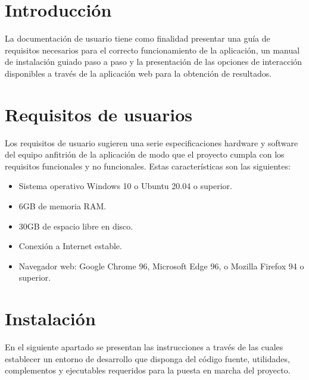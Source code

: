 
\section{Introducción}

La documentación de usuario tiene como finalidad presentar una guía de requisitos necesarios para el correcto funcionamiento de la aplicación, un manual de instalación guiado paso a paso y la presentación de las opciones de interacción disponibles a través de la aplicación web para la obtención de resultados.

\section{Requisitos de usuarios}

Los requisitos de usuario sugieren una serie especificaciones hardware y software del equipo anfitrión de la aplicación de modo que el proyecto cumpla con los requisitos funcionales y no funcionales. Estas características son las siguientes:

\begin{itemize} \setlength\itemsep{0.2em}
    \item Sistema operativo Windows 10 o Ubuntu 20.04 o superior.
    \item 6GB de memoria RAM.
    \item 30GB de espacio libre en disco.
    \item Conexión a Internet estable.
    \item Navegador web: Google Chrome 96, Microsoft Edge 96, o Mozilla Firefox 94 o superior.
\end{itemize}

\section{Instalación}

En el siguiente apartado se presentan las instrucciones a través de las cuales establecer un entorno de desarrollo que disponga del código fuente, utilidades, complementos y ejecutables requeridos para la puesta en marcha del proyecto. 

